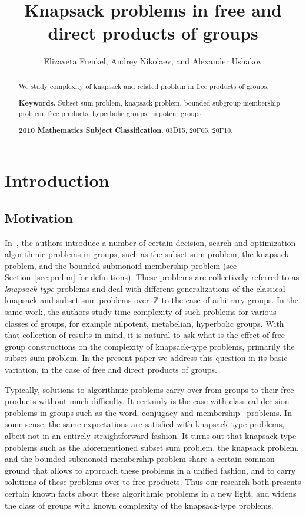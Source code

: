 \documentclass[10pt]{amsart}
\title{Knapsack problems in free and direct products of groups}
\author[]{Elizaveta Frenkel, Andrey Nikolaev, and Alexander Ushakov}
\theoremstyle{definition}
\begin{document}
\begin{abstract}
We study complexity of knapsack and related problem in free products of groups.

\noindent
{\bf Keywords.} Subset sum problem,  knapsack problem, bounded subgroup membership problem, free products, hyperbolic groups, nilpotent groups.

\noindent
{\bf 2010 Mathematics Subject Classification.} 03D15, 20F65, 20F10.
\end{abstract}
\maketitle

\section{Introduction}\label{sec:intro}


\subsection{Motivation}\label{sub:motivation}
In~\cite{Miasnikov-Nikolaev-Ushakov:2014a}, the authors introduce a number of certain decision, search and optimization algorithmic problems in groups, such as the subset sum problem, the knapsack problem, and the bounded submonoid membership problem (see Section~\ref{sec:prelim} for definitions). These problems are collectively referred to as {\em knapsack-type} problems and deal with different generalizations of the classical knapsack and subset sum problems over~$\mathbb Z$ to the case of arbitrary groups. In the same work, the authors study time complexity of such problems for various classes of groups, for example nilpotent, metabelian, hyperbolic groups. With that collection of results in mind, it is natural to ask what is the effect of free group constructions on the complexity of knapsack-type problems, primarily the subset sum problem. In the present paper we address this question in its basic variation, in the case of free and direct products of groups.

Typically, solutions to algorithmic problems carry over from groups to their free products without much difficulty. It certainly is the case with classical decision problems in groups such as the word, conjugacy and membership~\cite{Mikhailova_68} problems. In some sense, the same expectations are satisfied with knapsack-type problems, albeit not in an entirely straightforward fashion. It turns out that knapsack-type problems such as the aforementioned subset sum problem, the knapsack problem, and the bounded submonoid membership problem share a certain common ground that allows to approach these problems in a unified fashion, and to carry solutions of these problems over to free products. Thus our research both presents certain known facts about these algorithmic problems in a new light, and widens the class of groups with known complexity of the knapsack-type problems.
\end{document}
